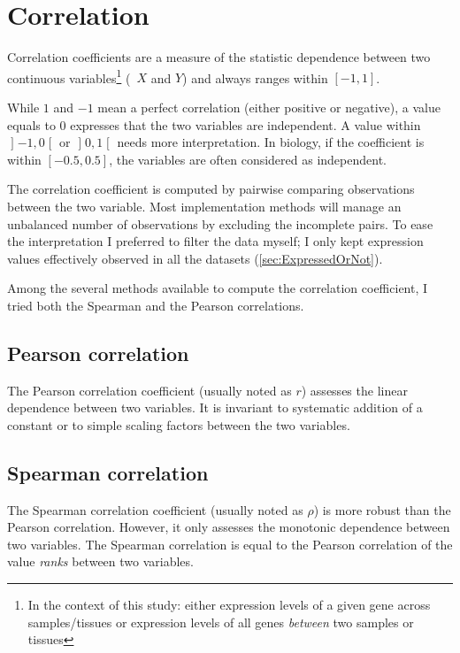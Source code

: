 \section{Correlation}


Correlation coefficients are a measure of the statistic dependence between two
continuous variables\footnote{In the context of this study: either expression
levels of a given gene across samples/tissues or expression levels of all genes
\emph{between} two samples or tissues} (\eg\
$X$ and $Y$) and always ranges within $[-1,1]$.

While $1$ and $-1$ mean a perfect correlation (either positive or negative),
a value equals to $0$ expresses that the two variables are independent.
A value within $\mathopen]-1,0\mathclose[$
or $\mathopen]0,1\mathclose[$ needs more interpretation. In biology, if the
coefficient is within $[-0.5,0.5]$, the variables are often considered as
independent.

The correlation coefficient is computed by pairwise comparing observations
between the two variable. Most implementation methods
will manage an unbalanced number of observations by excluding the incomplete pairs.
To ease the interpretation I preferred to filter the data \latin{a priori}
myself; I only kept expression values effectively observed in all the datasets
(\cref{sec:ExpressedOrNot}).

Among the several methods available to compute the correlation coefficient, I
tried both the Spearman and the Pearson correlations.

\subsection{Pearson correlation}
The Pearson correlation coefficient (usually noted as $r$) assesses the linear
dependence between two variables. It is invariant to systematic addition of a
constant or to simple scaling factors between the two variables.

\subsection{Spearman correlation}
The Spearman correlation coefficient (usually noted as $\rho$)
is more robust than the Pearson correlation.
However, it only assesses the monotonic dependence between two variables.
The Spearman correlation is equal to the Pearson correlation of the value
\emph{ranks} between two variables.


